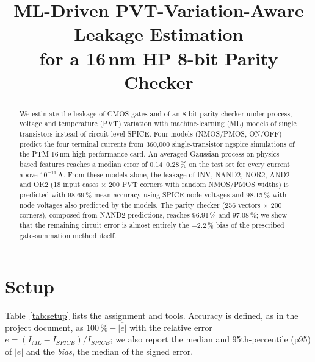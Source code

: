 ﻿\documentclass[conference,10pt]{IEEEtran}
\newcommand{\pct}{\,\%}
\begin{document}
\title{ML-Driven PVT-Variation-Aware Leakage Estimation\\for a 16\,nm HP 8-bit Parity Checker}

\author{
}

\maketitle

\begin{abstract}
We estimate the leakage of CMOS gates and of an 8-bit parity checker under process, voltage and
temperature (PVT) variation with machine-learning (ML) models of single transistors instead of
circuit-level SPICE. Four models (NMOS/PMOS, ON/OFF) predict the four terminal currents from
360,000 single-transistor ngspice simulations of the PTM 16\,nm high-performance card. An averaged
Gaussian process on physics-based features reaches a median error of 0.14--0.28\pct{} on the test
set for every current above $10^{-11}$\,A. From these models alone, the leakage of INV, NAND2, NOR2,
AND2 and OR2 (18 input cases $\times$ 200 PVT corners with random NMOS/PMOS widths) is predicted
with 98.69\pct{} mean accuracy using SPICE node voltages and 98.15\pct{} with node voltages also
predicted by the models. The parity checker (256 vectors $\times$ 200 corners), composed from
NAND2 predictions, reaches 96.91\pct{} and 97.08\pct{}; we show that the remaining circuit error
is almost entirely the $-2.2$\pct{} bias of the prescribed gate-summation method itself.
\end{abstract}

\section{Setup}

Table~\ref{tab:setup} lists the assignment and tools. Accuracy is defined, as in the project
document, as $100\pct - \overline{|e|}$ with the relative error $e=(I_{ML}-I_{SPICE})/I_{SPICE}$;
we also report the median and 95th-percentile (p95) of $|e|$ and the \emph{bias}, the median of
the signed error.
\end{document}

